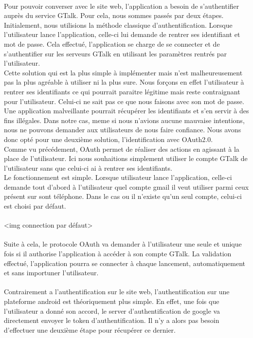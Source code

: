 \paragraph{}
Pour pouvoir converser avec le site web, l'application a besoin de s'authentifier auprès du service
GTalk. Pour cela, nous sommes passés par deux étapes. 
\\
Initialement, nous utilisions la méthode classique d'authentification. Lorsque l'utilisateur lance 
l'application, celle-ci lui demande de rentrer ses identifiant et mot de passe. Cela effectué, 
l'application se charge de se connecter et de s'authentifier sur les serveurs GTalk en utilisant les
paramètres rentrés par l'utilisateur.
\\
Cette solution qui est la plus simple à implémenter mais n'est malheureusement pas la plus agréable
à utiliser ni la plus sure. Nous forçons en effet l'utilisateur à rentrer ses identifiants ce qui 
pourrait paraitre légitime mais reste contraignant pour l'utilisateur. Celui-ci ne sait pas ce que 
nous faisons avec son mot de passe. Une application malveillante pourrait récupérer les identifiants
et s'en servir à des fins illégales. Dans notre cas, meme si nous n'avions aucune mauvaise intentions,
nous ne pouvons demander aux utilisateurs de nous faire confiance. Nous avons donc opté pour une 
deuxième solution, l'identification avec OAuth2.0.
\\
Comme vu précédement, OAuth permet de réaliser des actions en agissant à la place de l'utilisateur. 
Ici nous souhaitions simplement utiliser le compte GTalk de l'utilisateur sans que celui-ci ai à rentrer
ses identifiants. 
\\
Le fonctionnement est simple. Lorsque utilisateur lance l'application, celle-ci demande tout d'abord
à l'utilisateur quel compte gmail il veut utiliser parmi ceux présent sur sont téléphone. Dans le cas
ou il n'existe qu'un seul compte, celui-ci est choisi par défaut.
\\\\
<img connection par défaut>
\\\\
Suite à cela, le protocole OAuth va demander à l'utilisateur une seule et unique fois si il authorise 
l'application à accéder à son compte GTalk. La validation effectué, l'application pourra se connecter 
à chaque lancement, automatiquement et sans importuner l'utilisateur. 

\paragraph{}
Contrairement a l'authentification sur le site web, l'authentification sur une plateforme android est
théoriquement plus simple. En effet, une fois que l'utilisateur a donné son accord, le server 
d'authentification de google va directement envoyer le token d'authentification. Il n'y a alors pas 
besoin d'effectuer une deuxième étape pour récupérer ce dernier.

